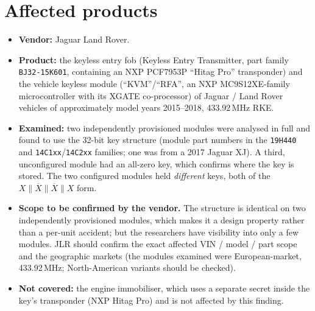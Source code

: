 \documentclass[11pt,a4paper]{article}
\newcommand{\hex}[1]{\texttt{#1}}
\begin{document}
\section{Affected products}
\begin{itemize}
\item \textbf{Vendor:} Jaguar Land Rover.
\item \textbf{Product:} the keyless entry fob (Keyless Entry Transmitter, part family \hex{BJ32-15K601}, containing an NXP PCF7953P ``Hitag Pro'' transponder) and the vehicle keyless module (``KVM''/``RFA'', an NXP MC9S12XE-family microcontroller with its XGATE co-processor) of Jaguar / Land Rover vehicles of approximately model years 2015--2018, 433.92\,MHz RKE.
\item \textbf{Examined:} two independently provisioned modules were analysed in full and found to use the 32-bit key structure (module part numbers in the \hex{19H440} and \hex{14C1xx}/\hex{14C2xx} families; one was from a 2017 Jaguar XJ). A third, unconfigured module had an all-zero key, which confirms where the key is stored. The two configured modules held \emph{different} keys, both of the $X \parallel \overline{X} \parallel \overline{X} \parallel X$ form.
\item \textbf{Scope to be confirmed by the vendor.} The structure is identical on two independently provisioned modules, which makes it a design property rather than a per-unit accident; but the researchers have visibility into only a few modules. JLR should confirm the exact affected VIN / model / part scope and the geographic markets (the modules examined were European-market, 433.92\,MHz; North-American variants should be checked).
\item \textbf{Not covered:} the engine immobiliser, which uses a separate secret inside the key's transponder (NXP Hitag Pro) and is not affected by this finding.
\end{itemize}
\end{document}
